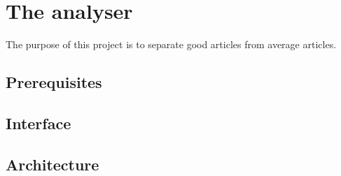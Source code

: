 \section{The analyser}
The purpose of this project is to separate good articles from average articles.

\subsection{Prerequisites}


\subsection{Interface}


\subsection{Architecture}

